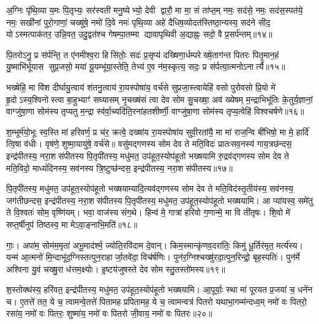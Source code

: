 अ॒ग्निः पृ॑थि॒व्या य॒मः पि॒तृभ्यः॒ सर॑स्वती मनु॒ष्येभ्यो॒ देवी द्वारौ॒ मा मा॒ सं ता॑प्त॒म् नमः॒ सद॑से॒ नमः॒ सद॑स॒स्पत॑ये॒ नमः॒ सखी॑नां पुरो॒गाणां॒ चख्षु॑षे॒ नमो॑ दि॒वे नमः॑ पृथि॒व्या अहे॑ दैधिष॒व्योदत॑स्तिष्ठा॒न्यस्य॒ सद॑ने सीद॒ योऽस्मत्पाक॑तर॒ उन्नि॒वत॒ उदु॒द्वत॑श्च गेषम्पा॒तम्मा द्यावापृथिवी अ॒द्याह्नः॒ सदो॒ वै प्र॒सर्प॑न्तम्॥१४॥

पि॒तरोऽनु॒ प्र स॑र्पन्ति॒ त ए॑नमीश्व॒रा हिसि॑तोः॒ सदः॑ प्र॒सृप्य॑ दख्षिणा॒र्धम्परेख्षे॒ताग॑न्त पितरः पितृ॒मान॒हं यु॒ष्माभि॑र्भूयास सुप्र॒जसो॒ मया॑ यू॒यम्भू॑या॒स्तेति॒ तेभ्य॑ ए॒व न॑म॒स्कृत्य॒ सदः॒ प्र स॑र्पत्या॒त्मनोऽनार्त्यै॥१५॥

{\anuvakamend[{म॒खो वा अ॒न्तरि॑ख्षात्प्र॒सर्प॑न्त॒न्त्रय॑स्त्रिशच्च॥४॥}]}

भख्षेहि॒ मा वि॑श दीर्घायु॒त्वाय॑ शंतनु॒त्वाय॑ रा॒यस्पोषा॑य॒ वर्च॑से सुप्रजा॒स्त्वायेहि॑ वसो पुरोवसो प्रि॒यो मे॑ हृ॒दोऽस्य॒श्विनोस्त्वा बा॒हुभ्याꣳ॑ सघ्यासम् नृ॒चख्ष॑सं त्वा देव सोम सु॒चख्षा॒ अव॑ ख्येषम् म॒न्द्राभिभू॑तिः के॒तुर्य॒ज्ञानां॒ वाग्जु॑षा॒णा सोम॑स्य तृप्यतु म॒न्द्रा स्व॑र्वा॒च्यदि॑ति॒रना॑हतशीर्ष्णी॒ वाग्जु॑षा॒णा सोम॑स्य तृप्य॒त्वेहि॑ विश्वचर्\mbox{}षणे॥१६॥

श॒म्भूर्म॑यो॒भूः स्व॒स्ति मा॑ हरिवर्ण॒ प्र च॑र॒ क्रत्वे॒ दख्षा॑य रा॒यस्पोषा॑य सुवी॒रता॑यै॒ मा मा॑ राज॒न्वि बी॑भिषो॒ मा मे॒ हार्दि॑ त्वि॒षा व॑धीः। वृष॑णे॒ शुष्मा॒यायु॑षे॒ वर्च॑से॥ वसु॑मद्गणस्य सोम देव ते मति॒विदः॑ प्रातःसव॒नस्य॑ गाय॒त्रछ॑न्दस॒ इन्द्र॑पीतस्य॒ नरा॒शस॑पीतस्य पि॒तृपी॑तस्य॒ मधु॑मत॒ उप॑हूत॒स्योप॑हूतो भख्षयामि रु॒द्रव॑द्गणस्य सोम देव ते मति॒विदो॒ माध्यं॑दिनस्य॒ सव॑नस्य त्रि॒ष्टुप्छ॑न्दस॒ इन्द्र॑पीतस्य॒ नरा॒शस॑पीतस्य॥१७॥

पि॒तृपी॑तस्य॒ मधु॑मत॒ उप॑हूत॒स्योप॑हूतो भख्षयाम्यादि॒त्यव॑द्गणस्य सोम देव ते मति॒विद॑स्तृ॒तीय॑स्य॒ सव॑नस्य॒ जग॑तीछन्दस॒ इन्द्र॑पीतस्य॒ नरा॒शस॑पीतस्य पि॒तृपी॑तस्य॒ मधु॑मत॒ उप॑हूत॒स्योप॑हूतो भख्षयामि। आ प्या॑यस्व॒ समे॑तु ते वि॒श्वतः॑ सोम॒ वृष्णि॑यम्। भवा॒ वाज॑स्य संग॒थे। हिन्व॑ मे॒ गात्रा॑ हरिवो ग॒णान्मे॒ मा वि ती॑तृषः। शि॒वो मे॑ सप्त॒र्\mbox{}षीनुप॑ तिष्ठस्व॒ मा मेऽवा॒ङ्नाभि॒मति॑॥१८॥

गाः॒। अपा॑म॒ सोम॑म॒मृता॑ अभू॒माद॑र्श्म॒ ज्योति॒रवि॑दाम दे॒वान्। किम॒स्मान्कृ॑णव॒दरा॑तिः॒ किमु॑ धू॒र्तिर॑मृत॒ मर्त्य॑स्य। यन्म॑ आ॒त्मनो॑ मि॒न्दाभू॑द॒ग्निस्तत्पुन॒राहार्जा॒तवे॑दा॒ विच॑र्\mbox{}षणिः। पुन॑र॒ग्निश्चख्षु॑रदा॒त्पुन॒रिन्द्रो॒ बृह॒स्पतिः॑। पुन॑र्मे अश्विना यु॒वं चख्षु॒रा ध॑त्तम॒क्ष्योः। इ॒ष्टय॑जुषस्ते देव सोम स्तु॒तस्तो॑मस्य॥१९॥

श॒स्तोक्थ॑स्य॒ हरि॑वत॒ इन्द्र॑पीतस्य॒ मधु॑मत॒ उप॑हूत॒स्योप॑हूतो भख्षयामि। आ॒पूर्याः॒ स्था मा॑ पूरयत प्र॒जया॑ च॒ धने॑न च। ए॒तत्ते॑ तत॒ ये च॒ त्वामन्वे॒तत्ते॑ पितामह प्रपितामह॒ ये च॒ त्वामन्वत्र॑ पितरो यथाभा॒गम्म॑न्दध्व॒म् नमो॑ वः पितरो॒ रसा॑य॒ नमो॑ वः पितरः॒ शुष्मा॑य॒ नमो॑ वः पितरो जी॒वाय॒ नमो॑ वः पितरः॥२०॥

